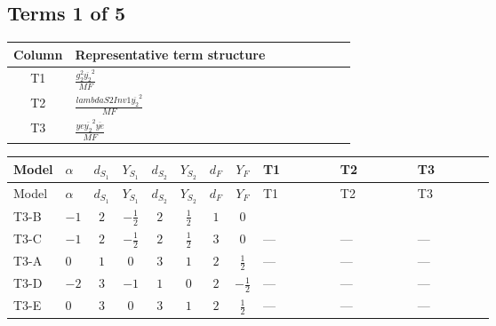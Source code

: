 \documentclass[8pt]{article}
\begin{document}
\begin{landscape}
\subsection*{Terms 1 of 5}
\begin{center}
\begin{tabular}{@{}c >{\raggedright\arraybackslash}p{0.82\linewidth}@{}}
\toprule
Column & Representative term structure \\
\midrule
T1 & \(\displaystyle \frac{g_{2}^{2} \overline{y_{2}}^{2}}{MF}\) \\
\midrule
T2 & \(\displaystyle \frac{lambdaS2Inv1 \overline{y_{2}}^{2}}{MF}\) \\
\midrule
T3 & \(\displaystyle \frac{ye \overline{y_{2}}^{2} \overline{ye}}{MF}\) \\
\midrule
\bottomrule
\end{tabular}
\end{center}
\smallskip
\tiny
\begin{longtable}{@{}llcccccc >{\raggedright\arraybackslash}p{0.21\linewidth} >{\raggedright\arraybackslash}p{0.21\linewidth} >{\raggedright\arraybackslash}p{0.21\linewidth}@{}}
\toprule
Model & $\alpha$ & $d_{S_1}$ & $Y_{S_1}$ & $d_{S_2}$ & $Y_{S_2}$ & $d_F$ & $Y_F$ & T1 & T2 & T3 \\
\midrule
\endfirsthead
\toprule
Model & $\alpha$ & $d_{S_1}$ & $Y_{S_1}$ & $d_{S_2}$ & $Y_{S_2}$ & $d_F$ & $Y_F$ & T1 & T2 & T3 \\
\midrule
\endhead
T3-B & $-1$ & $2$ & $-\frac{1}{2}$ & $2$ & $\frac{1}{2}$ & $1$ & $0$ & \scriptsize\adjustbox{max width=\linewidth}{$\begin{gathered} - \frac{3 g_{2}^{2} \overline{y_{2}}^{2}}{8 MF}\end{gathered}$} & \scriptsize\adjustbox{max width=\linewidth}{$\begin{gathered} - \frac{lambdaS2Inv1 \overline{y_{2}}^{2}}{4 MF}\end{gathered}$} & \scriptsize\adjustbox{max width=\linewidth}{$\begin{gathered} \frac{ye \overline{y_{2}}^{2} \overline{ye}}{8 MF}\end{gathered}$} \\
\midrule
T3-C & $-1$ & $2$ & $-\frac{1}{2}$ & $2$ & $\frac{1}{2}$ & $3$ & $0$ & --- & --- & --- \\
\midrule
T3-A & $0$ & $1$ & $0$ & $3$ & $1$ & $2$ & $\frac{1}{2}$ & --- & --- & --- \\
\midrule
T3-D & $-2$ & $3$ & $-1$ & $1$ & $0$ & $2$ & $-\frac{1}{2}$ & --- & --- & --- \\
\midrule
T3-E & $0$ & $3$ & $0$ & $3$ & $1$ & $2$ & $\frac{1}{2}$ & --- & --- & --- \\
\midrule
\bottomrule
\end{longtable}
\clearpage

\end{landscape}
\end{document}
